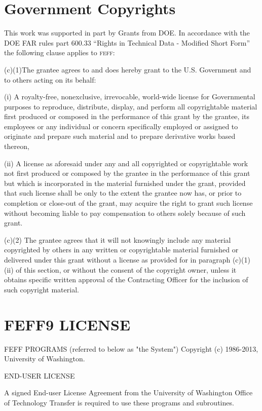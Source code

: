 \documentclass[11pt,oneside]{report} %
\newcommand{\program}[1]{\textsc{#1}}
\newcommand{\feff}{\program{feff}}
\begin{document}
\begin{latexonly}
\section{Government Copyrights}
\label{sec:Governm-Copyr}

This work was supported in part by Grants from DOE. In accordance with
the DOE FAR rules part 600.33 ``Rights in Technical Data - Modified
Short Form'' the following clause applies to {\feff}:

(c)(1)The grantee agrees to and does hereby grant to the U.S.
Government and to others acting on its behalf:

(i) A royalty-free, nonexclusive, irrevocable, world-wide license for
Governmental purposes to reproduce, distribute, display, and perform
all copyrightable material first produced or composed in the
performance of this grant by the grantee, its employees or any
individual or concern specifically employed or assigned to originate
and prepare such material and to prepare derivative works based
thereon,

(ii) A license as aforesaid under any and all copyrighted or
copyrightable work not first produced or composed by the grantee in the
performance of this grant but which is incorporated in the material
furnished under the grant, provided that such license shall be only to
the extent the grantee now has, or prior to completion or close-out of
the grant, may acquire the right to grant such license without becoming
liable to pay compensation to others solely because of such grant.

(c)(2) The grantee agrees that it will not knowingly include any
material copyrighted by others in any written or copyrightable material
furnished or delivered under this grant without a license as provided
for in paragraph (c)(1)(ii) of this section, or without the consent of
the copyright owner, unless it obtains specific written approval of the
Contracting Officer for the inclusion of such copyright material.

\section{FEFF9 LICENSE}
\label{sec:F9license}

 FEFF PROGRAMS (referred to below as "the System")
 Copyright (c) 1986-2013, University of Washington.

 END-USER LICENSE

 A signed End-user License Agreement from the University of Washington
 Office of Technology Transfer is required to use these programs and
 subroutines.


\end{latexonly}
\end{document}
